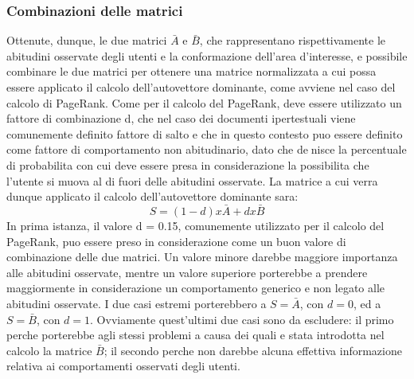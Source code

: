 \subsubsection{Combinazioni delle matrici}
Ottenute, dunque, le due matrici $\bar{A}$ e $\bar{B}$, che rappresentano rispettivamente
le abitudini osservate degli utenti e la conformazione dell'area d'interesse, e
possibile combinare le due matrici per ottenere una matrice normalizzata a cui
possa essere applicato il calcolo dell'autovettore dominante, come avviene nel
caso del calcolo di PageRank. Come per il calcolo del PageRank, deve essere
utilizzato un fattore di combinazione d, che nel caso dei documenti ipertestuali
viene comunemente definito fattore di salto e che in questo contesto puo essere
definito come fattore di comportamento non abitudinario, dato che denisce
la percentuale di probabilita con cui deve essere presa in considerazione la
possibilita che l'utente si muova al di fuori delle abitudini osservate. La matrice
a cui verra dunque applicato il calcolo dell'autovettore dominante sara:
$$
S = (1 - d) x \bar{A} + d x \bar{B}
$$
In prima istanza, il valore d = 0.15, comunemente utilizzato per il calcolo del
PageRank, puo essere preso in considerazione come un buon valore di combinazione
delle due matrici. Un valore minore darebbe maggiore importanza alle
abitudini osservate, mentre un valore superiore porterebbe a prendere maggiormente
in considerazione un comportamento generico e non legato alle abitudini
osservate. I due casi estremi porterebbero a $S = \bar{A}$, con $d = 0$,
ed a $S = \bar{B}$, con $d = 1$. Ovviamente quest'ultimi due casi sono da
escludere: il primo perche porterebbe agli stessi problemi a causa dei quali e
stata introdotta nel calcolo la matrice $\bar{B}$; il secondo perche non darebbe
alcuna effettiva informazione relativa ai comportamenti osservati degli utenti.


